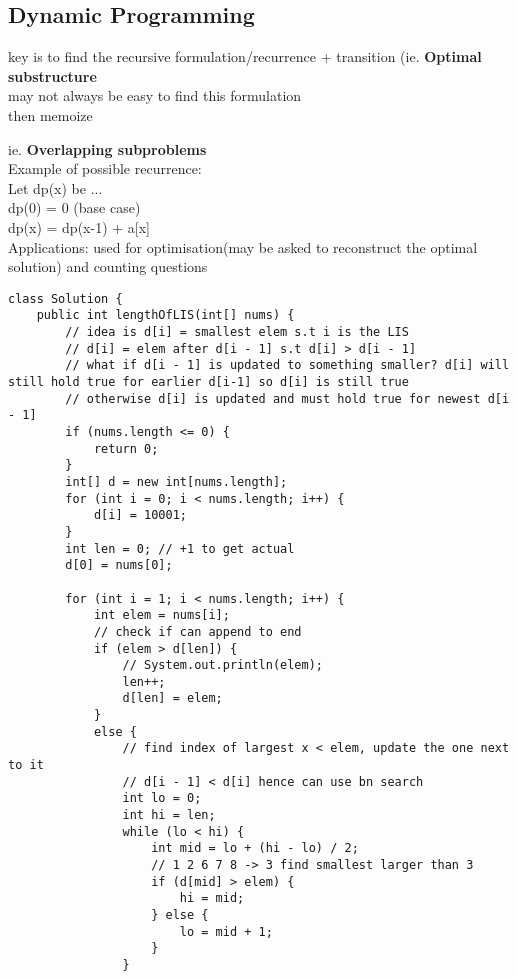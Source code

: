 \documentclass[12pt]{article}
\begin{document}
\subsection{Dynamic Programming} 
key is to find the recursive formulation/recurrence + transition (ie. {\textbf{Optimal substructure}} \\ 
may not always be easy to find this formulation \\ 
then memoize {ie. {\textbf{Overlapping subproblems}} \\ 

\noindent Example of possible recurrence: \\ 
Let dp(x) be ... \\ 
dp(0) = 0 (base case) \\ 
dp(x) = dp(x-1) + a[x] \\ 


Applications: used for optimisation(may be asked to reconstruct the optimal solution) and counting questions 

\begin{verbatim} 
class Solution {
    public int lengthOfLIS(int[] nums) {
        // idea is d[i] = smallest elem s.t i is the LIS  
        // d[i] = elem after d[i - 1] s.t d[i] > d[i - 1]
        // what if d[i - 1] is updated to something smaller? d[i] will still hold true for earlier d[i-1] so d[i] is still true 
        // otherwise d[i] is updated and must hold true for newest d[i - 1]
        if (nums.length <= 0) {
            return 0; 
        }
        int[] d = new int[nums.length]; 
        for (int i = 0; i < nums.length; i++) {
            d[i] = 10001; 
        }
        int len = 0; // +1 to get actual 
        d[0] = nums[0]; 
        
        for (int i = 1; i < nums.length; i++) {
            int elem = nums[i]; 
            // check if can append to end 
            if (elem > d[len]) {
                // System.out.println(elem); 
                len++; 
                d[len] = elem; 
            } 
            else {
                // find index of largest x < elem, update the one next to it 
                // d[i - 1] < d[i] hence can use bn search 
                int lo = 0; 
                int hi = len; 
                while (lo < hi) {
                    int mid = lo + (hi - lo) / 2; 
                    // 1 2 6 7 8 -> 3 find smallest larger than 3
                    if (d[mid] > elem) {
                        hi = mid;
                    } else {
                        lo = mid + 1; 
                    }
                }
                

\end{verbatim}}
\end{document}
